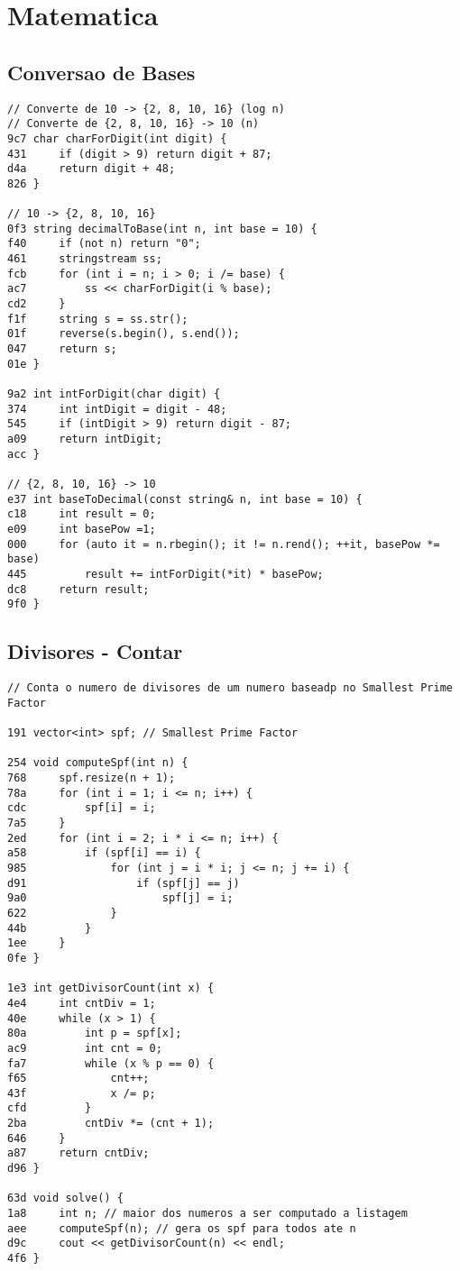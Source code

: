 \documentclass[11pt, a4paper, twoside]{article}
\begin{document}
%
%

\section{Matematica}

\subsection{Conversao de Bases}
\begin{lstlisting}
// Converte de 10 -> {2, 8, 10, 16} (log n)
// Converte de {2, 8, 10, 16} -> 10 (n)
9c7 char charForDigit(int digit) {
431     if (digit > 9) return digit + 87;
d4a     return digit + 48;
826 }

// 10 -> {2, 8, 10, 16}
0f3 string decimalToBase(int n, int base = 10) {
f40     if (not n) return "0";
461     stringstream ss;
fcb     for (int i = n; i > 0; i /= base) {
ac7         ss << charForDigit(i % base);
cd2     }
f1f     string s = ss.str();
01f     reverse(s.begin(), s.end());
047     return s;
01e }

9a2 int intForDigit(char digit) {
374     int intDigit = digit - 48;
545     if (intDigit > 9) return digit - 87;
a09     return intDigit;
acc }

// {2, 8, 10, 16} -> 10
e37 int baseToDecimal(const string& n, int base = 10) {
c18     int result = 0;
e09     int basePow =1;
000     for (auto it = n.rbegin(); it != n.rend(); ++it, basePow *= base)
445         result += intForDigit(*it) * basePow;
dc8     return result;
9f0 }
\end{lstlisting}

\subsection{Divisores - Contar}
\begin{lstlisting}
// Conta o numero de divisores de um numero baseadp no Smallest Prime Factor

191 vector<int> spf; // Smallest Prime Factor

254 void computeSpf(int n) {
768     spf.resize(n + 1);
78a     for (int i = 1; i <= n; i++) {
cdc         spf[i] = i;
7a5     }
2ed     for (int i = 2; i * i <= n; i++) {
a58         if (spf[i] == i) {
985             for (int j = i * i; j <= n; j += i) {
d91                 if (spf[j] == j)
9a0                     spf[j] = i;
622             }
44b         }
1ee     }
0fe }

1e3 int getDivisorCount(int x) {
4e4     int cntDiv = 1;
40e     while (x > 1) {
80a         int p = spf[x];
ac9         int cnt = 0;
fa7         while (x % p == 0) {
f65             cnt++;
43f             x /= p;
cfd         }
2ba         cntDiv *= (cnt + 1);
646     }
a87     return cntDiv;
d96 }

63d void solve() {
1a8 	int n; // maior dos numeros a ser computado a listagem
aee 	computeSpf(n); // gera os spf para todos ate n
d9c 	cout << getDivisorCount(n) << endl;
4f6 }
\end{lstlisting}
\end{document}
